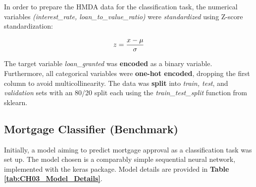 In order to prepare the HMDA data for the classification task, the numerical variables \textit{(interest\_rate, loan\_to\_value\_ratio)} were \textit{standardized} using Z-score standardization: 

\begin{equation}
    z = \frac{x - \mu}{\sigma}
    \label{eq:Z-Score Standardization}
    \addcontentsline{frm}{formulas}{\protect\numberline{\theequation}\hspace{1em}Z-Score Standardization}
\end{equation}

The target variable \textit{loan\_granted} was \textbf{encoded} as a binary variable. Furthermore, all categorical variables were \textbf{one-hot encoded}, dropping the first column to avoid multicollinearity.
The data was \textbf{split} into \textit{train, test}, and \textit{validation} sets with an 80/20 split each using the \textit{train\_test\_split} function from sklearn.


\subsection{Mortgage Classifier (Benchmark)}\label{subsec:Model_Training_and_Prediction}

Initially, a model aiming to predict mortgage approval as a classification task was set up. The model chosen is a comparably simple sequential neural network, implemented with the keras package. Model details are provided in \textbf{Table \ref{tab:CH03_Model_Details}}.

